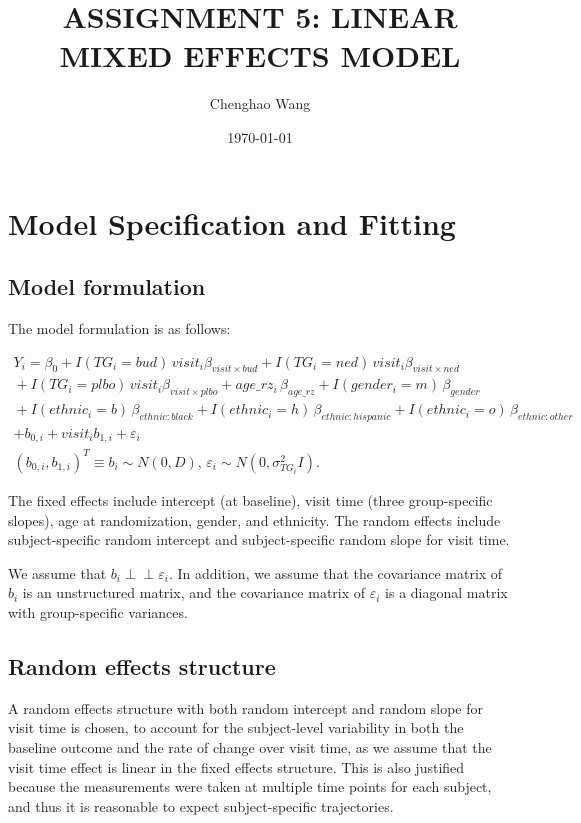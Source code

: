 \documentclass[12pt]{article}
\title{\Large\bfseries ASSIGNMENT 5: LINEAR MIXED EFFECTS MODEL}
\author{Chenghao Wang}
\date{\today}
\newcommand{\indep}{\perp \!\!\! \perp}%
\begin{document}
\maketitle

\section{Model Specification and Fitting}

\subsection{Model formulation}

The model formulation is as follows:

\begin{multline}
\label{eq:final-model}
Y_{i} = \beta_{0} + I(TG_i = bud)\,visit_{i}\beta_{visit \times bud}
+ I(TG_i = ned)\,visit_{i}\beta_{visit \times ned} \\
{}+ I(TG_i = plbo)\,visit_{i}\beta_{visit \times plbo}
+ age\_rz_{i}\,\beta_{age\_rz}
+ I(gender_{i} = m)\,\beta_{gender}\\
{}+ I(ethnic_{i} = b)\,\beta_{ethnic:black}
+ I(ethnic_{i} = h)\,\beta_{ethnic:hispanic}
{}+ I(ethnic_{i} = o)\,\beta_{ethnic:other} \\
+ b_{0,i} + visit_i b_{1,i} + \varepsilon_{i}\\
(b_{0,i}, b_{1,i})^T \equiv b_i \sim N(0, D),\,
\varepsilon_{i} \sim N(0,\sigma^2_{TG_i}I).
\end{multline}

The fixed effects include intercept (at baseline), visit time
(three group-specific slopes), age at randomization, gender,
and ethnicity. The random effects include subject-specific random intercept
and subject-specific random slope for visit time.

We assume that $b_i \indep \varepsilon_i$.
In addition, we assume that the covariance matrix of $b_i$
is an unstructured matrix, and the covariance matrix of
$\varepsilon_i$ is a diagonal matrix with group-specific variances.

\subsection{Random effects structure}

A random effects structure with both random intercept and
random slope for visit time is chosen,
to account for the subject-level variability in
both the baseline outcome and the rate of change over visit time,
as we assume that the visit time effect is linear
in the fixed effects structure.
This is also justified because the measurements
were taken at multiple time points for each subject,
and thus it is reasonable to expect subject-specific trajectories.
\end{document}
